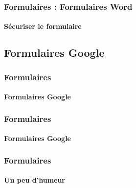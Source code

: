 \documentclass[xcolor=table]{beamer}
\begin{document}
\begin{frame}
\frametitle{Formulaires : Formulaires Word}
\framesubtitle{Sécuriser le formulaire}


\end{frame}

\subsection{Formulaires Google}

\begin{frame}
\frametitle{Formulaires}
\framesubtitle{Formulaires Google}

\end{frame}

\begin{frame}
\frametitle{Formulaires}
\framesubtitle{Formulaires Google}

\end{frame}


\begin{frame}
\frametitle{Formulaires}
\framesubtitle{Un peu d'humeur}
\begin{center}
\end{center}
\end{frame}


\end{document}
